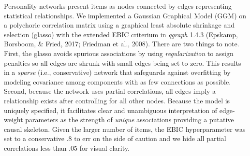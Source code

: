 \documentclass[english,man]{apa6}
\theoremstyle{definition}
\theoremstyle{definition}
\theoremstyle{remark}
\begin{document}
Personality networks present items as nodes connected by edges
representing statistical relationships. We implemented a Gaussian
Graphical Model (GGM) on a polychoric correlation matrix using a
graphical least absolute shrinkage and selection (glasso) with the
extended EBIC criterium in \emph{qgraph} 1.4.3 (Epskamp, Borsboom, \&
Fried, 2017; Friedman et al., 2008). There are two things to note.
First, the glasso avoids spurious associations by using
\emph{regularization} to assign penalties so all edges are shrunk with
small edges being set to zero. This results in a \emph{sparse} (i.e.,
conservative) network that safeguards against overfitting by modeling
covariance among components with as few connections as possible. Second,
because the network uses partial correlations, all edges imply a
relationship exists after controlling for all other nodes. Because the
model is uniquely specified, it facilitates clear and unambiguous
interpretation of edge-weight parameters as the strength of
\emph{unique} associations providing a putative causal skeleton. Given
the larger number of items, the EBIC hyperparameter was set to a
conservative .8 to err on the side of caution and we hide all partial
correlations less than .05 for visual clarity.
\end{document}
